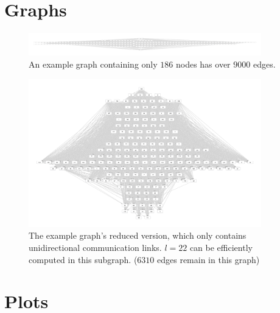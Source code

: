 
\appendix

{}	%

\section{Graphs}\label{appendix:graphs}

\begin{figure}[ht]
	\centering
		\includegraphics[width=0.90\textwidth]{figures/graphs/graphextrem.png}
	\caption{An example graph containing only $186$ nodes has over $9000$ edges.}
	\label{fig:graphextreme}
\end{figure}
\begin{figure}[ht]
	\centering
		\includegraphics[width=0.90\textwidth]{figures/graphs/graphn186l22.png}
	\caption{The example graph's reduced version, which only contains unidirectional communication links. $l = 22$ can be efficiently computed in this subgraph. ($6310$ edges remain in this graph)}
	\label{fig:graphbetter}
\end{figure}
\newpage
\section{Plots}

